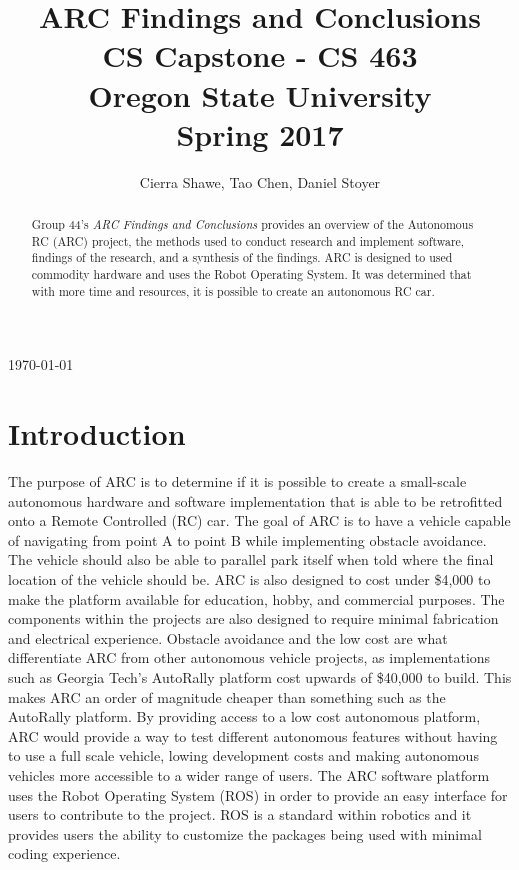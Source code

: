 \documentclass[compsoc,draftclsnofoot,onecolumn,10pt]{IEEEtran}
\begin{document}
\begin{titlepage}
\title{
ARC Findings and Conclusions \\
\LARGE
CS Capstone - CS 463\\
Oregon State University\\
Spring 2017
}

\author{Cierra Shawe, Tao Chen, Daniel Stoyer}
\maketitle
\begin{center}
	\today
\end{center}

\begin{abstract}

\noindent
Group 44's \textit{ARC Findings and Conclusions} provides an overview of the Autonomous RC (ARC) project, the methods used to conduct research and implement software, findings of the research, and a synthesis of the findings.
ARC is designed to used commodity hardware and uses the Robot Operating System. 
It was determined that with more time and resources, it is possible to create an autonomous RC car. 
\end{abstract}
\thispagestyle{empty} %

\end{titlepage}
\tableofcontents
\newpage

\section{Introduction}
The purpose of ARC is to determine if it is possible to create a small-scale autonomous hardware and software implementation that is able to be retrofitted onto a Remote Controlled (RC) car. 
The goal of ARC is to have a vehicle capable of navigating from point A to point B while implementing obstacle avoidance. The vehicle should also be able to parallel park itself when told where the final location of the vehicle should be. ARC is also designed to cost under \$4,000 to make the platform available for education, hobby, and commercial purposes. The components within the projects are also designed to require minimal fabrication and electrical experience. Obstacle avoidance and the low cost are what differentiate ARC from other autonomous vehicle projects, as implementations such as Georgia Tech’s AutoRally platform cost upwards of \$40,000 to build. This makes ARC an order of magnitude cheaper than something such as the AutoRally platform. 
By providing access to a low cost autonomous platform, ARC would provide a way to test different autonomous features without having to use a full scale vehicle, lowing development costs and making autonomous vehicles more accessible to a wider range of users. 
The ARC software platform uses the Robot Operating System (ROS) in order to provide an easy interface for users to contribute to the project. ROS is a standard within robotics and it provides users the ability to customize the packages being used with minimal coding experience. 
\end{document}
